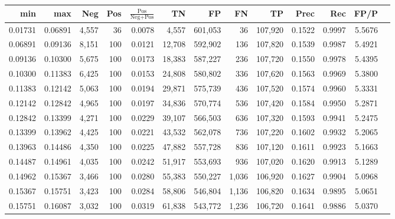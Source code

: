 \begin{tabular}{rrrrrrrrrrrrr}
\toprule
    min &     max &   Neg & Pos & $\frac{\text{Pos}}{\text{Neg}+\text{Pos}}$ &      TN &      FP &      FN &      TP &   Prec &    Rec &   FP/P \\
\midrule
0.01731 & 0.06891 & 4,557 &  36 &                                     0.0078 &   4,557 & 601,053 &      36 & 107,920 & 0.1522 & 0.9997 & 5.5676 \\
0.06891 & 0.09136 & 8,151 & 100 &                                     0.0121 &  12,708 & 592,902 &     136 & 107,820 & 0.1539 & 0.9987 & 5.4921 \\
0.09136 & 0.10300 & 5,675 & 100 &                                     0.0173 &  18,383 & 587,227 &     236 & 107,720 & 0.1550 & 0.9978 & 5.4395 \\
0.10300 & 0.11383 & 6,425 & 100 &                                     0.0153 &  24,808 & 580,802 &     336 & 107,620 & 0.1563 & 0.9969 & 5.3800 \\
0.11383 & 0.12142 & 5,063 & 100 &                                     0.0194 &  29,871 & 575,739 &     436 & 107,520 & 0.1574 & 0.9960 & 5.3331 \\
0.12142 & 0.12842 & 4,965 & 100 &                                     0.0197 &  34,836 & 570,774 &     536 & 107,420 & 0.1584 & 0.9950 & 5.2871 \\
0.12842 & 0.13399 & 4,271 & 100 &                                     0.0229 &  39,107 & 566,503 &     636 & 107,320 & 0.1593 & 0.9941 & 5.2475 \\
0.13399 & 0.13962 & 4,425 & 100 &                                     0.0221 &  43,532 & 562,078 &     736 & 107,220 & 0.1602 & 0.9932 & 5.2065 \\
0.13963 & 0.14486 & 4,350 & 100 &                                     0.0225 &  47,882 & 557,728 &     836 & 107,120 & 0.1611 & 0.9923 & 5.1663 \\
0.14487 & 0.14961 & 4,035 & 100 &                                     0.0242 &  51,917 & 553,693 &     936 & 107,020 & 0.1620 & 0.9913 & 5.1289 \\
0.14962 & 0.15367 & 3,466 & 100 &                                     0.0280 &  55,383 & 550,227 &   1,036 & 106,920 & 0.1627 & 0.9904 & 5.0968 \\
0.15367 & 0.15751 & 3,423 & 100 &                                     0.0284 &  58,806 & 546,804 &   1,136 & 106,820 & 0.1634 & 0.9895 & 5.0651 \\
0.15751 & 0.16087 & 3,032 & 100 &                                     0.0319 &  61,838 & 543,772 &   1,236 & 106,720 & 0.1641 & 0.9886 & 5.0370 \\

\end{tabular}
